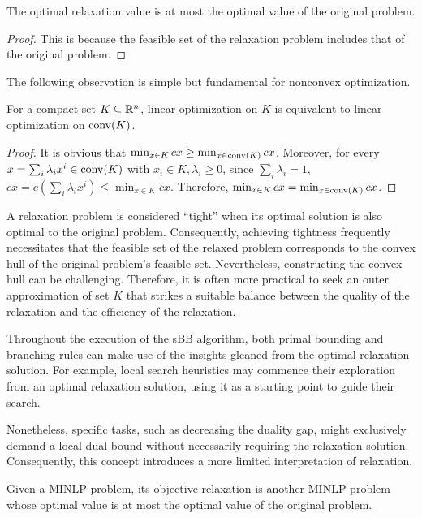 \begin{lemma}
    The optimal relaxation value is at most the optimal value of the original problem.
\end{lemma}
\begin{proof}
    This is because the feasible set of the relaxation problem includes that of the original problem.
\end{proof}


 The following observation is  simple but fundamental for nonconvex optimization.

\begin{lemma}
\label{lem.compacthull}
    For a compact set $K \subseteq \mathbb R^n$, linear optimization on $K$ is equivalent to linear optimization on $\operatorname{conv}(K)$.
\end{lemma}
\begin{proof}
    It is obvious that $\min_{x \in K} c x \ge \min_{x \in \operatorname{conv}(K)} c x$. Moreover, for every $x  = \sum_{i} \lambda_i x^i \in \operatorname{conv}(K)$ with $x_i \in K,\lambda_i \ge 0$, since $\sum_i \lambda_i = 1$, $cx = c (\sum_{i} \lambda_i x^i) \le \min_{x \in K} c x  $. Therefore,  $\min_{x \in K} c x = \min_{x \in \operatorname{conv}(K)} c x$. 
\end{proof}


A relaxation problem is considered ``tight'' when its optimal solution is also optimal to the original problem. Consequently, achieving tightness frequently necessitates that the feasible set of the relaxed problem corresponds to the convex hull of the original problem's feasible set. Nevertheless, constructing the convex hull can be challenging. Therefore, it is often more practical to seek an outer approximation of set $K$ that strikes a suitable balance between the quality of the relaxation and the efficiency of the relaxation.


Throughout the execution of the sBB algorithm, both primal bounding and branching rules can make use of the insights gleaned from the optimal relaxation solution. For example, local search heuristics may commence their exploration from an optimal relaxation solution, using it as a starting point to guide their search.

Nonetheless, specific tasks, such as decreasing the duality gap, might exclusively demand a local dual bound without necessarily requiring the relaxation solution. Consequently, this concept introduces a more limited interpretation of relaxation.

\begin{definition}
     Given a MINLP problem, its objective relaxation is another MINLP problem whose optimal value is at most the optimal value of the original problem.
\end{definition}




